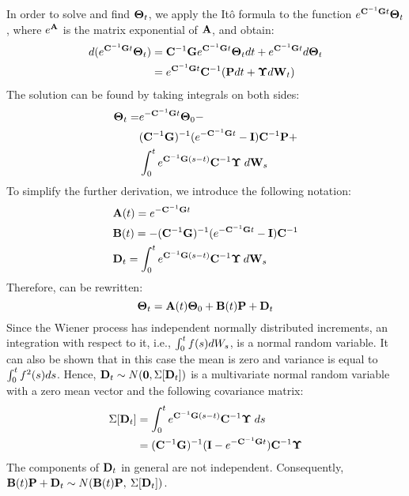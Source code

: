 In order to solve  and find $\mathbf{\Theta}_t$, we apply the It\^{o} formula to the function $e^{ \mathbf{C}^{-1} \mathbf{G} t} \mathbf{\Theta}_t$, where $e^{\mathbf{A}}$ is the matrix exponential of $\mathbf{A}$, and obtain:
\begin{align*}
  d(e^{\mathbf{C}^{-1} \mathbf{G} t} \mathbf{\Theta}_t) & = \mathbf{C}^{-1} \mathbf{G} e^{\mathbf{C}^{-1} \mathbf{G} t} \mathbf{\Theta}_t dt + e^{\mathbf{C}^{-1} \mathbf{G} t} d\mathbf{\Theta}_t \\
  & = e^{\mathbf{C}^{-1} \mathbf{G} t} \mathbf{C}^{-1} (\mathbf{P} dt + \mathbf{\Upsilon} d\mathbf{W}_t)
\end{align*}
The solution can be found by taking integrals on both sides:
\begin{align} \equlabel{solution-full}
  \vtemperature_\time = & \emcgt \vtemperature_0 - \\
    & (\cg)^{-1}(\emcgt - \mone) \mcapacitance^{-1} \vpower + \nonumber \\
    & \int_0^\time \ecg{}{(s - \time)} \mcapacitance^{-1} \mnoisedeviation \; d\m{W}_s \nonumber
\end{align}
To simplify the further derivation, we introduce the following notation:
\begin{align}
  & \m{A}(\time) = \emcg{\time} \equlabel{a} \\
  & \m{B}(\time) = -(\cg)^{-1}(\emcg{\time} - \mone) \mcapacitance^{-1} \equlabel{b} \\
  & \v{D}_\time = \int_0^{\time} \ecg{}{(s - \time)} \mcapacitance^{-1} \mnoisedeviation \: d\m{W}_s \equlabel{d}
\end{align}
Therefore,  can be rewritten:
\[
  \mathbf{\Theta}_t = \mathbf{A}(t) \mathbf{\Theta}_0 + \mathbf{B}(t) \mathbf{P} + \mathbf{D}_t
\]
Since the Wiener process has independent normally distributed increments, an integration with respect to it, i.e., $\int_0^t f(s) dW_s$, is a normal random variable. It can also be shown that in this case the mean is zero and variance is equal to $\int_0^t f^2(s) ds$. Hence, $\mathbf{D}_t \sim N(\mathbf{0}, \Sigma[\mathbf{D}_t])$ is a multivariate normal random variable with a zero mean vector and the following covariance matrix:
\begin{align}
  \covariance{\v{D}_\time} & = \int_0^\time \ecg{}{(s - \time)} \mcapacitance^{-1} \mnoisedeviation \; ds \nonumber \\
    & = (\cg)^{-1} (\mone - \emcgt) \mcapacitance^{-1} \mnoisedeviation \equlabel{covariance-d}
\end{align}
The components of $\mathbf{D}_t$ in general are not independent. Consequently, $\mathbf{B}(t) \mathbf{P} + \mathbf{D}_t \sim N(\mathbf{B}(t) \mathbf{P}, \: \Sigma[\mathbf{D}_t])$.

